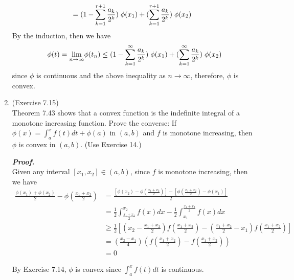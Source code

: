 \documentclass[a4paper,11pt]{article}
\begin{document}
\begin{enumerate}
$$\begin{aligned}
 		&= (1 - \sum_{k=1}^{r+1} \frac{a_k}{2^k}) \hspace{0.1cm} \phi(x_1) + (\sum_{k=1}^{r+1} \frac{a_k}{2^k}) \hspace{0.1cm} \phi(x_2)
 		\end{aligned}$$
 		By the induction, then we have
 		$$\phi(t)
 		= \underset{n \to \infty}{\lim} \phi(t_n)
 		\leq (1 - \sum_{k=1}^\infty \frac{a_k}{2^k}) \hspace{0.1cm} \phi(x_1) + (\sum_{k=1}^\infty \frac{a_k}{2^k}) \hspace{0.1cm} \phi(x_2)$$
 		since $\phi$ is continuous and the above inequality as $n \to \infty$, therefore, $\phi$ is convex.\\







 	\item (Exercise 7.15)\\
 		Theorem 7.43 shows that a convex function is the indefinite integral of a monotone increasing function. Prove the converse: If $\phi(x) = \int_a^x f(t) dt + \phi(a)$ in $(a,b)$ and $f$ is monotone increasing, then $\phi$ is convex in $(a,b)$. (Use Exercise 14.)

 		\textit{\textbf {Proof.}}\\
 		Given any interval $[x_1,x_2] \in (a,b)$, since $f$ is monotone increasing, then we have
 		$$\begin{aligned}
 		\frac{\phi(x_1) + \phi(x_2)}{2} - \phi(\frac{x_1 + x_2}{2})
 		&= \frac{[\phi(x_2) - \phi(\frac{x_1 + x_2}{2})] - [\phi(\frac{x_1 + x_2}{2}) - \phi(x_1)] }{2}\\
 		&= \frac{1}{2} \int_{\frac{x_1 + x_2}{2}}^{x_2} f(x) dx - \frac{1}{2} \int_{x_1}^{\frac{x_1 + x_2}{2}} f(x) dx\\
 		&\geq \frac{1}{2} \left[ \left(x_2 - \frac{x_1 + x_2}{2} \right) f(\frac{x_1 + x_2}{2}) - \left( \frac{x_1 + x_2}{2} - x_1 \right) f(\frac{x_1 + x_2}{2}) \right]\\
 		&= \left( \frac{x_2 - x_1}{4} \right) \left( f(\frac{x_1 + x_2}{2}) - f(\frac{x_1 + x_2}{2}) \right)\\
 		&= 0
 		\end{aligned}$$

 		By Exercise 7.14, $\phi$ is convex since $\int_a^x f(t) dt$ is continuous.\\








\end{enumerate}
\end{document}
